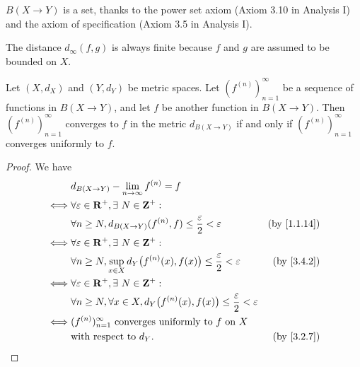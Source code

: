 \begin{note}
  \(B(X \to Y)\) is a set, thanks to the power set axiom (Axiom 3.10 in Analysis I) and the axiom of specification (Axiom 3.5 in Analysis I).
\end{note}

\begin{note}
  The distance \(d_\infty(f, g)\) is always finite because \(f\) and \(g\) are assumed to be bounded on \(X\).
\end{note}

\setcounter{theorem}{3}
\begin{proposition}\label{3.4.4}
  Let \((X, d_X)\) and \((Y, d_Y)\) be metric spaces.
  Let \((f^{(n)})_{n = 1}^\infty\) be a sequence of functions in \(B(X \to Y)\), and let \(f\) be another function in \(B(X \to Y)\).
  Then \((f^{(n)})_{n = 1}^\infty\) converges to \(f\) in the metric \(d_{B(X \to Y)}\) if and only if \((f^{(n)})_{n = 1}^\infty\) converges uniformly to \(f\).
\end{proposition}

\begin{proof}
  We have
  \begin{align*}
         & d_{B(X \to Y)} - \lim_{n \to \infty} f^{(n)} = f                                                                                      \\
    \iff & \forall \varepsilon \in \R^+, \exists\ N \in \Z^+ :                                                                                   \\
         & \forall n \geq N, d_{B(X \to Y)}(f^{(n)}, f) \leq \frac{\varepsilon}{2} < \varepsilon                     & \text{(by \cref{1.1.14})} \\
    \iff & \forall \varepsilon \in \R^+, \exists\ N \in \Z^+ :                                                                                   \\
         & \forall n \geq N, \sup_{x \in X} d_Y\big(f^{(n)}(x), f(x)\big) \leq \frac{\varepsilon}{2} < \varepsilon   & \text{(by \cref{3.4.2})}  \\
    \iff & \forall \varepsilon \in \R^+, \exists\ N \in \Z^+ :                                                                                   \\
         & \forall n \geq N, \forall x \in X, d_Y\big(f^{(n)}(x), f(x)\big) \leq \frac{\varepsilon}{2} < \varepsilon                             \\
    \iff & (f^{(n)})_{n = 1}^\infty \text{ converges uniformly to } f \text{ on } X                                                              \\
         & \text{with respect to } d_Y.                                                                              & \text{(by \cref{3.2.7})}
  \end{align*}
\end{proof}

